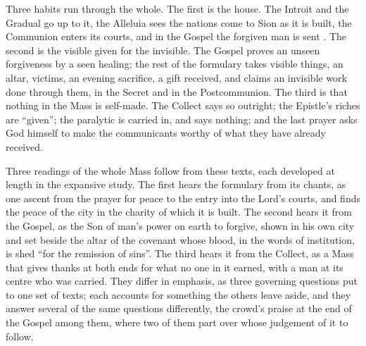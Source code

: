 Three habits run through the whole. The first is the house. The Introit and the
Gradual go up to it, the Alleluia sees the nations come to Sion as it is built,
the Communion enters its courts, and in the Gospel the forgiven man is sent
. The second is the visible given for the invisible. The
Gospel proves an unseen forgiveness by a seen healing; the rest of the
formulary takes visible things, an altar, victims, an evening sacrifice, a gift
received, and claims an invisible work done through them,  in
the Secret and  in the Postcommunion. The third is that nothing
in the Mass is self-made. The Collect says so outright; the Epistle's riches are
``given''; the paralytic is carried in, and says nothing; and the last prayer
asks God himself to make the communicants worthy of what they have already
received.

Three readings of the whole Mass follow from these texts, each developed at
length in the expansive study. The first hears the formulary from its chants,
as one ascent from the prayer for peace to the entry into the Lord's courts, and
finds the peace of the city in the charity of which it is built. The second
hears it from the Gospel, as the Son of man's power on earth to forgive, shown
in his own city and set beside the altar of the covenant whose blood, in the
words of institution, is shed ``for the remission of sins''. The third hears it
from the Collect, as a Mass that gives thanks at both ends for what no one in it
earned, with a man at its centre who was carried. They differ in emphasis, as
three governing questions put to one set of texts; each accounts for
something the others leave aside, and they answer several of the same
questions differently, the crowd's praise at the end of the Gospel among
them, where two of them part over whose judgement of it to follow.
